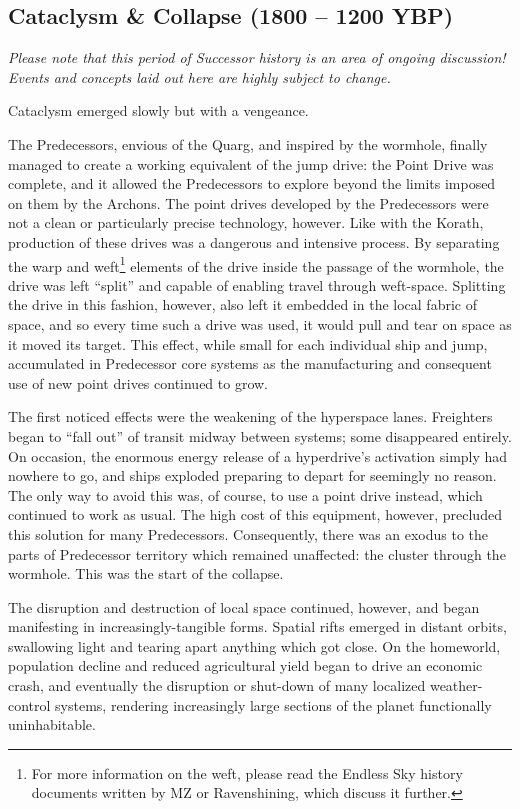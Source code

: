 \documentclass[11pt]{report}
\begin{document}
    \subsection{Cataclysm \& Collapse (1800 -- 1200 YBP)}

    \emph{Please note that this period of Successor history is an area of ongoing discussion! Events and concepts laid out here are highly subject to change.}

    \medskip

    Cataclysm emerged slowly but with a vengeance. 

    The Predecessors, envious of the Quarg, and inspired by the wormhole, finally managed to create a working equivalent of the jump drive: the Point Drive was complete, and it allowed the Predecessors to explore beyond the limits imposed on them by the Archons. The point drives developed by the Predecessors were not a clean or particularly precise technology, however. Like with the Korath, production of these drives was a dangerous and intensive process. By separating the warp and weft\footnote[2]{For more information on the weft, please read the Endless Sky history documents written by MZ or Ravenshining, which discuss it further.} elements of the drive inside the passage of the wormhole, the drive was left ``split'' and capable of enabling travel through weft-space. Splitting the drive in this fashion, however, also left it embedded in the local fabric of space, and so every time such a drive was used, it would pull and tear on space as it moved its target. This effect, while small for each individual ship and jump, accumulated in Predecessor core systems as the manufacturing and consequent use of new point drives continued to grow.

    The first noticed effects were the weakening of the hyperspace lanes. Freighters began to ``fall out'' of transit midway between systems; some disappeared entirely. On occasion, the enormous energy release of a hyperdrive's activation simply had nowhere to go, and ships exploded preparing to depart for seemingly no reason. The only way to avoid this was, of course, to use a point drive instead, which continued to work as usual. The high cost of this equipment, however, precluded this solution for many Predecessors. Consequently, there was an exodus to the parts of Predecessor territory which remained unaffected: the cluster through the wormhole. This was the start of the collapse.

    The disruption and destruction of local space continued, however, and began manifesting in increasingly-tangible forms. Spatial rifts emerged in distant orbits, swallowing light and tearing apart anything which got close. On the homeworld, population decline and reduced agricultural yield began to drive an economic crash, and eventually the disruption or shut-down of many localized weather-control systems, rendering increasingly large sections of the planet functionally uninhabitable.
\end{document}
